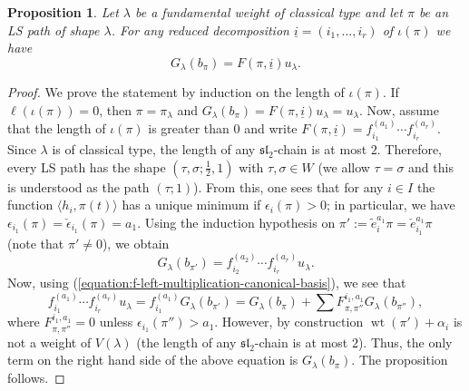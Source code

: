 \documentclass[final]{amsart}
\theoremstyle{plain}
\newtheorem{proposition}[corollary]{Proposition}
\theoremstyle{definition}
\newcommand{\fraksl}{\mathfrak{sl}}
\newcommand{\uli}{{\underline i}}
\newcommand{\te}{\tilde e}
\newcommand{\ce}{\check{e}}
\newcommand{\cepsilon}{\check{\epsilon}}
\DeclareMathOperator{\weight}{wt}
\begin{document}
\begin{proposition}
    \label{proposition:canonical-basis-classical-fundamental-weight}
    Let $\lambda$ be a fundamental weight of classical type and let $\pi$ be an LS path of shape $\lambda$.
    For any reduced decomposition $\uli = (i_1, \dots, i_r)$ of $\iota(\pi)$ we have
    \[
        G_\lambda(b_\pi) = F(\pi, \uli) u_\lambda.
    \]
\end{proposition}
\begin{proof}
    We prove the statement by induction on the length of $\iota(\pi)$.
    If $\ell(\iota(\pi)) = 0$, then $\pi = \pi_\lambda$ and $G_\lambda(b_\pi) = F(\pi, \uli) u_\lambda = u_\lambda$.
    Now, assume that the length of $\iota(\pi)$ is greater than $0$ and write $F(\pi, \uli) = f_{i_1}^{(a_1)} \cdots f_{i_r}^{(a_r)}$.
    Since $\lambda$ is of classical type, the length of any $\fraksl_2$-chain is at most $2$.
    Therefore, every LS path has the shape $(\tau, \sigma; \frac12, 1)$ with $\tau, \sigma \in W$ (we allow $\tau = \sigma$ and this is understood as the path $(\tau; 1)$).
    From this, one sees that for any $i\in I$ the function $\langle h_i, \pi(t)\rangle$ has a unique minimum if $\epsilon_i(\pi) > 0$; in particular, we have $\epsilon_{i_1}(\pi) = \cepsilon_{i_1}(\pi) = a_1$.
    Using the induction hypothesis on $\pi' := \te_i^{a_1} \pi = \ce_{i_1}^{a_1} \pi$ (note that $\pi' \neq 0$), we obtain
    \[
        G_\lambda(b_{\pi'}) = f_{i_2}^{(a_2)}\cdots f_{i_r}^{(a_r)} u_\lambda.
    \]
    Now, using (\ref{equation:f-left-multiplication-canonical-basis}), we see that
    \[
        f_{i_1}^{(a_1)} \cdots f_{i_r}^{(a_r)} u_\lambda = f_{i_1}^{(a_1)} G_\lambda(b_{\pi'}) = G_\lambda(b_\pi) + \sum F_{\pi,\pi''}^{i_1,a_1} G_\lambda(b_{\pi''}),
    \]
    where $F_{\pi,\pi''}^{i_1,a_1} = 0$ unless $\epsilon_{i_1}(\pi'') > a_1$.
    However, by construction $\weight(\pi') + \alpha_i$ is not a weight of $V(\lambda)$ (the length of any $\fraksl_2$-chain is at most $2$).
    Thus, the only term on the right hand side of the above equation is $G_\lambda(b_\pi)$.
    The proposition follows.
\end{proof}
\end{document}
